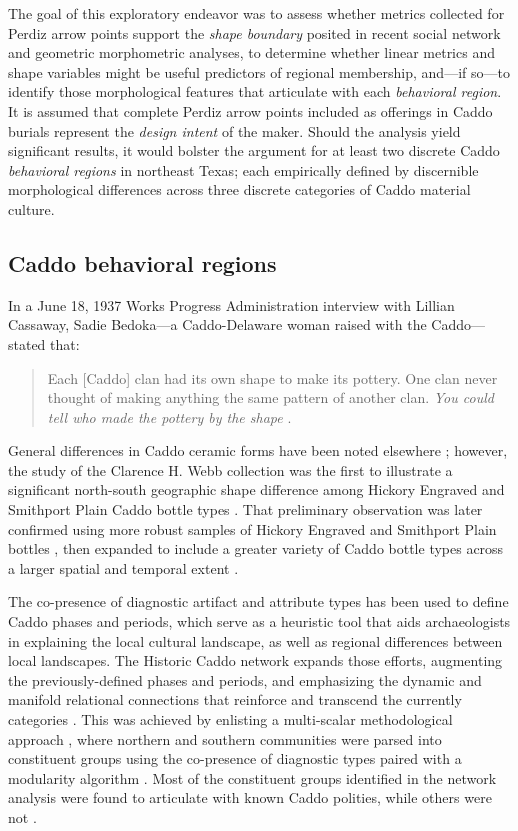 \documentclass[smallextended]{svjour3}       %
\begin{document}
The goal of this exploratory endeavor was to assess whether metrics
collected for Perdiz arrow points support the \emph{shape boundary}
posited in recent social network and geometric morphometric analyses, to
determine whether linear metrics and shape variables might be useful
predictors of regional membership, and---if so---to identify those
morphological features that articulate with each \emph{behavioral
region}. It is assumed that complete Perdiz arrow points included as
offerings in Caddo burials represent the \emph{design intent} of the
maker. Should the analysis yield significant results, it would bolster
the argument for at least two discrete Caddo \emph{behavioral regions}
in northeast Texas; each empirically defined by discernible
morphological differences across three discrete categories of Caddo
material culture.

\hypertarget{caddo-behavioral-regions}{%
\subsection{Caddo behavioral regions}\label{caddo-behavioral-regions}}

In a June 18, 1937 Works Progress Administration interview with Lillian
Cassaway, Sadie Bedoka---a Caddo-Delaware woman raised with the
Caddo---stated that:

\begin{quote}
Each {[}Caddo{]} clan had its own shape to make its pottery. One clan
never thought of making anything the same pattern of another clan.
\emph{You could tell who made the pottery by the shape}
\cite[395]{RN9357x}.
\end{quote}

General differences in Caddo ceramic forms have been noted elsewhere
\cite{RN5650,RN7162}; however, the study of the Clarence H. Webb
collection was the first to illustrate a significant north-south
geographic shape difference among Hickory Engraved and Smithport Plain
Caddo bottle types \cite{RN8370}. That preliminary observation was later
confirmed using more robust samples of Hickory Engraved and Smithport
Plain bottles \cite{RN8074,RN7927}, then expanded to include a greater
variety of Caddo bottle types across a larger spatial and temporal
extent \cite{RN8312}.

The co-presence of diagnostic artifact and attribute types has been used
to define Caddo phases and periods, which serve as a heuristic tool that
aids archaeologists in explaining the local cultural landscape, as well
as regional differences between local landscapes. The Historic Caddo
network expands those efforts, augmenting the previously-defined phases
and periods, and emphasizing the dynamic and manifold relational
connections that reinforce and transcend the currently categories
\cite{RN8031}. This was achieved by enlisting a multi-scalar
methodological approach \cite{RN5644,RN8039}, where northern and
southern communities were parsed into constituent groups using the
co-presence of diagnostic types paired with a modularity algorithm
\cite{RN8051,RN8024}. Most of the constituent groups identified in the
network analysis were found to articulate with known Caddo polities,
while others were not \cite{RN8031}.
\end{document}

